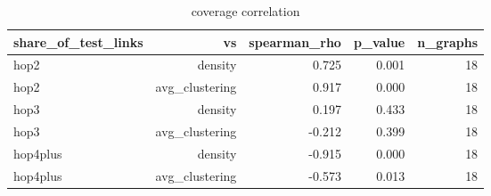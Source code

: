 \begin{table}[t]
\centering
\caption{coverage correlation}
\label{tab:coverage_correlation}
\begin{tabular}{lrrrr}
\hline
share\_of\_test\_links & vs & spearman\_rho & p\_value & n\_graphs \\
\hline
hop2 & density & 0.725 & 0.001 & 18 \\
hop2 & avg\_clustering & 0.917 & 0.000 & 18 \\
hop3 & density & 0.197 & 0.433 & 18 \\
hop3 & avg\_clustering & -0.212 & 0.399 & 18 \\
hop4plus & density & -0.915 & 0.000 & 18 \\
hop4plus & avg\_clustering & -0.573 & 0.013 & 18 \\
\hline
\end{tabular}
\end{table}